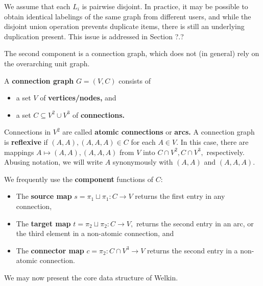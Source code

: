 We assume that each $L_{i}$ is pairwise disjoint. In practice, it may be possible to obtain identical labelings of the same graph from different users, and while the disjoint union operation prevents duplicate items, there is still an underlying duplication present. This issue is addressed in Section ?.?

The second component is a connection graph, which does not (in general) rely on the overarching unit graph.

\begin{definition}
  A \textbf{connection graph} $G = (V, C)$ consists of
  \begin{itemize}
    \item a set $V$ of \textbf{vertices/nodes,} and
    \item a set $C \subseteq V^{2} \cup V^{3}$ of \textbf{connections.} %
  \end{itemize}
  Connections in $V^{2}$ are called \textbf{atomic connections} or \textbf{arcs.} A connection graph is \textbf{reflexive} if $(A, A), (A, A, A) \in C$ for each $A \in V.$ In this case, there are mappings $A \mapsto (A, A), (A, A, A)$ from $V$ into $C \cap V^{2}, C \cap V^{3},$ respectively. Abusing notation, we will write $A$ synonymously with $(A, A)$ and $(A, A, A).$

  We frequently use the \textbf{component} functions of $C$:
  \begin{itemize}
  \item The \textbf{source map} $s = \pi_{1} \sqcup \pi_{1}: C \to V$ returns the first entry in any connection,
  \item The \textbf{target map} $t = \pi_{2} \sqcup \pi_{2}: C \to V,$ returns the second entry in an arc, or the third element in a non-atomic connection, and
  \item The \textbf{connector map} $c = \pi_{2}: C \cap V^{3} \to V$ returns the second entry in a non-atomic connection.
  \end{itemize}
\end{definition}



We may now present the core data structure of Welkin.

